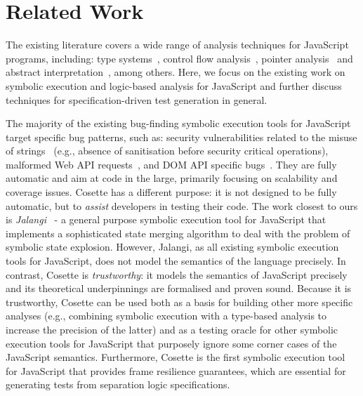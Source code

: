 \documentclass[sigconf, review]{acmart}
\newcommand{\cosette}{Cosette\xspace}
\newcommand{\myparagraph}[1]{\smallskip\noindent {\bf #1.}\hspace{1pt}}
\begin{document}
\section{Related Work}
\label{sec:rwc} 

The existing literature covers a wide range of analysis techniques for JavaScript programs, including: 
type systems~\cite{thiemann:esop:2005,anderson:ecoop:2005,jensen:sas:2009,typescript:toot:2014,feldthaus:oopsla:2014,bierman:ecoop:2014,rastogi:popl:2015},
control flow analysis~\cite{feldthaus2013efficient}, pointer analysis~\cite{jang2009points,sridharan:ecoop:12} and abstract
interpretation~\cite{kashyap:fse:14,jensen:sas:2009,andreasen:oopsla:2014,park:ecoop:15}, among others. 
Here, we focus on the existing work on symbolic execution and  
logic-based analysis for JavaScript and further discuss techniques for specification-driven 
test generation in general.  

\myparagraph{Symbolic Execution for JS}
The majority of the existing bug-finding symbolic execution tools for JavaScript target specific bug patterns, 
such as: security vulnerabilities related to the misuse of strings~\cite{saxena:sp:2010} 
(e.g., absence of sanitisation before security critical operations), malformed Web API requests~\cite{wittern:icse:2018}, and
DOM API specific bugs~\cite{li:fse:2014}. They are fully automatic and aim at code in 
the large, primarily focusing on scalability and coverage issues. \cosette has a different 
purpose: it is not designed to be fully automatic, but to \emph{assist} developers in 
testing their code. 
%
The work closest to ours is \emph{Jalangi}~\cite{koushik:fse:2015} - a general purpose 
symbolic execution tool for JavaScript that implements a sophisticated state merging 
algorithm to deal with the problem of symbolic state explosion. 
%
However, Jalangi, as all existing symbolic execution tools for JavaScript, does not model 
the semantics of the language precisely. 
%
In contrast, \cosette is \emph{trustworthy}: it models the semantics of 
JavaScript precisely and its theoretical underpinnings are formalised and proven sound. 
Because it is trustworthy, \cosette can be used both as a basis for building other more specific analyses 
(e.g., combining symbolic execution with a type-based analysis to increase the precision of the latter) and 
as a testing oracle for other symbolic execution tools for JavaScript that purposely 
ignore some corner cases of the JavaScript semantics. 
Furthermore, \cosette is the first symbolic execution tool for JavaScript that provides 
frame resilience guarantees, which are essential for generating tests from separation logic specifications. 
\end{document}
